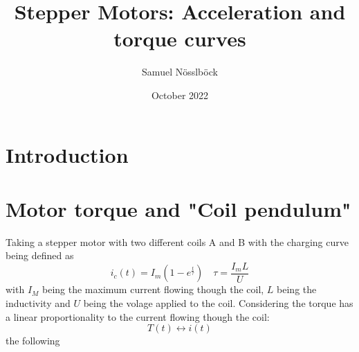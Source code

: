 \documentclass{article}
\title{Stepper Motors: Acceleration and torque curves}
\author{Samuel Nösslböck}
\date{October 2022}
\begin{document}
\maketitle

\section{Introduction}

\section{Motor torque and "Coil pendulum"}

Taking a stepper motor with two different coils A and B with the charging curve being defined as
\begin{equation}
    i_c(t) = I_{m} (1 - e^{\frac{t}{\tau}}) \quad \tau = \frac{I_{m}L}{U}
\end{equation}
with $I_M$ being the maximum current flowing though the coil, $L$ being the inductivity and $U$ being the volage applied to the coil.
Considering the torque has a linear proportionality to the current flowing though the coil:
\[
    T(t) \leftrightarrow i(t)
\]
the following 
\end{document}

